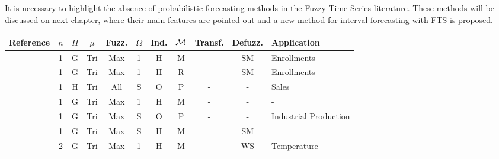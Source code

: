 It is necessary to highlight the absence of probabilistic forecasting methods in the Fuzzy Time Series literature. These methods will be discussed on next chapter, where their main features are pointed out and a new method for interval-forecasting with FTS is proposed. 

\begin{center}
    \begin{landscape}
\begin{longtable}[c]{|m{4cm}|c|c|c|c|c|c|c|c|c|m{5cm}|} \hline
\textbf{Reference}   & $n$ & $\Pi$ & $\mu$ & \textbf{Fuzz.} & $\Omega$ & \textbf{Ind.} & \textbf{$\mathcal{M}$}      & \textbf{Transf.} & \textbf{Defuzz.} & \textbf{Application}  \\ \hline \hline
\endhead
%
\cite{song1993fuzzy}      & 1                  & G                  & Tri  & Max                & 1              & H                       & M              & -                        & SM              & Enrollments           \\ \hline
\cite{chen1996forecasting} & 1                  & G                  & Tri  & Max                & 1              & H                       & R               & -                        & SM              & Enrollments           \\ \hline
\cite{Chang1997}           & 1                  & H             & Tri  & All                    & S       & O                    & P          & -                        & -                        & Sales                 \\ \hline
\cite{Song1997}            & 1                  & G                  & Tri  & Max                & 1              & H                       & M              & -                        & -                        & -                     \\ \hline
\cite{Tseng1999}           & 1                  & G                  & Tri  & Max                & S       & O                   & P           & -                        & -                        & Industrial Production \\ \hline
\cite{Song1999}            & 1                  & G                  & Tri  & Max                & S       & H                       & M              & -                        & SM              & -                     \\ \hline
\cite{Chen2000}            & 2                  & G                  & Tri  & Max                & 1              & H                       & M              & -                        & WS            & Temperature           \\ \hline

\end{longtable}
\end{landscape}
\end{center}
